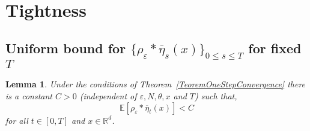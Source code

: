 \documentclass[a4paper,12pt]{article}
\newtheorem{lemma}[theorem]{Lemma}
\newcommand{\EE}{\mathbb{E}}
\newcommand{\1}{{\bf {1}}}
\def\epsilon{\varepsilon}
\begin{document}
\section{Tightness}

\subsection{Uniform bound for $\{ \rho_\epsilon * \overline{\eta}_s (x)\}_{0 \leq s \leq T}$ for fixed $T$}
\begin{lemma} \label{FirstBoundLocalDensity}
Under the conditions of Theorem~\ref{TeoremOneStepConvergence} there is a constant $C>0$ (independent of $\epsilon, N, \theta, x$ and $T$) such that,
\[ \EE[ \rho_\epsilon*\overline{\eta}_t(x) ] < C \]
for all $t \in [0,T]$ and $x \in \mathbb{R}^d$.
\end{lemma}
\end{document}
